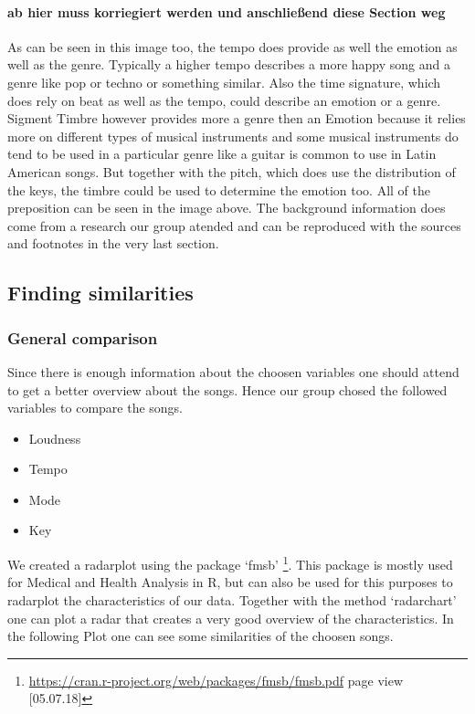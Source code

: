 \documentclass[]{article}
\providecommand{\tightlist}{%
  \setlength{\itemsep}{0pt}\setlength{\parskip}{0pt}}
\let\oldparagraph\paragraph
\renewcommand{\paragraph}[1]{\oldparagraph{#1}\mbox{}}
\let\rmarkdownfootnote\footnote%
\def\footnote{\protect\rmarkdownfootnote}
\begin{document}
\paragraph{ab hier muss korriegiert werden und anschließend diese
Section
weg}\label{ab-hier-muss-korriegiert-werden-und-anschlieend-diese-section-weg}

As can be seen in this image too, the tempo does provide as well the
emotion as well as the genre. Typically a higher tempo describes a more
happy song and a genre like pop or techno or something similar. Also the
time signature, which does rely on beat as well as the tempo, could
describe an emotion or a genre. Sigment Timbre however provides more a
genre then an Emotion because it relies more on different types of
musical instruments and some musical instruments do tend to be used in a
particular genre like a guitar is common to use in Latin American songs.
But together with the pitch, which does use the distribution of the
keys, the timbre could be used to determine the emotion too. All of the
preposition can be seen in the image above. The background information
does come from a research our group atended and can be reproduced with
the sources and footnotes in the very last section.

\subsection{Finding similarities}\label{finding-similarities}

\subsubsection{General comparison}\label{general-comparison}

Since there is enough information about the choosen variables one should
attend to get a better overview about the songs. Hence our group chosed
the followed variables to compare the songs.

\begin{itemize}
\tightlist
\item
  Loudness
\item
  Tempo
\item
  Mode
\item
  Key
\end{itemize}

We created a radarplot using the package `fmsb' \footnote{\url{https://cran.r-project.org/web/packages/fmsb/fmsb.pdf}
  page view {[}05.07.18{]}}. This package is mostly used for Medical and
Health Analysis in R, but can also be used for this purposes to
radarplot the characteristics of our data. Together with the method
`radarchart' one can plot a radar that creates a very good overview of
the characteristics. In the following Plot one can see some similarities
of the choosen songs.
\end{document}
